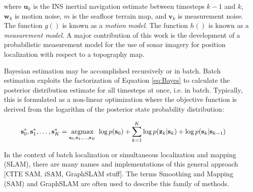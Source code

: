 \noindent where $\mathbf{u}_k$ is the INS inertial navigation estimate between timesteps $k-1$ and $k$, $\mathbf{w}_k$ is motion noise, $m$ is the seafloor terrain map, and $\mathbf{v}_k$ is measurement noise. 
The function $g()$ is known as a \emph{motion model}.  
The function $h()$ is known as a \emph{measurement model}. 
A major contribution of this work is the development of a probabilistic measurement model for the use of sonar imagery for position localization with respect to a topography map.

Bayesian estimation may be accomplished recursively or in batch.  
Batch estimation exploits the factorization of Equation \ref{eq:Bayes} to calculate the posterior distribution estimate for all timesteps at once, i.e. in batch.
Typically, this is formulated as a non-linear optimization where the objective function is derived from the  logarithm of the posterior state probability distribution:

\begin{align}
\begin{split}
\mathbf{s}_0^*, \mathbf{s}_1^*, \hdots, \mathbf{s}_K^* &= \underset{\mathbf{s}_0, \mathbf{s}_1, \hdots, \mathbf{s}_K}{\text{argmax}} \hspace{1ex}  \text{log} \hspace{0.4ex} p(\mathbf{s}_0) + \sum_{k=1}^{K} \text{log} \hspace{0.4ex} p(\mathbf{z}_k | \mathbf{s}_k) + \text{log} \hspace{0.4ex} p(\mathbf{s}_k | \mathbf{s}_{k-1})
\end{split}
\label{eq:batchBayes}
\end{align}

In the context of batch localization or simultaneous localization and mapping (SLAM), there are many names and implementations of this general approach [CITE SAM, iSAM, GraphSLAM stuff].  The terms Smoothing and Mapping (SAM) and GraphSLAM are often used to describe this family of methods.

